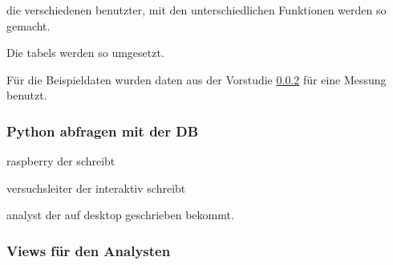 die verschiedenen benutzter, mit den unterschiedlichen Funktionen werden so gemacht.

Die tabels werden so umgesetzt.

Für die Beispieldaten wurden daten aus der Vorstudie \ref{} für eine Messung benutzt.

\subsubsection{Python abfragen mit der DB}
raspberry der schreibt

versuchsleiter der interaktiv schreibt

analyst der auf desktop geschrieben bekommt.

\subsubsection{Views für den Analysten}
